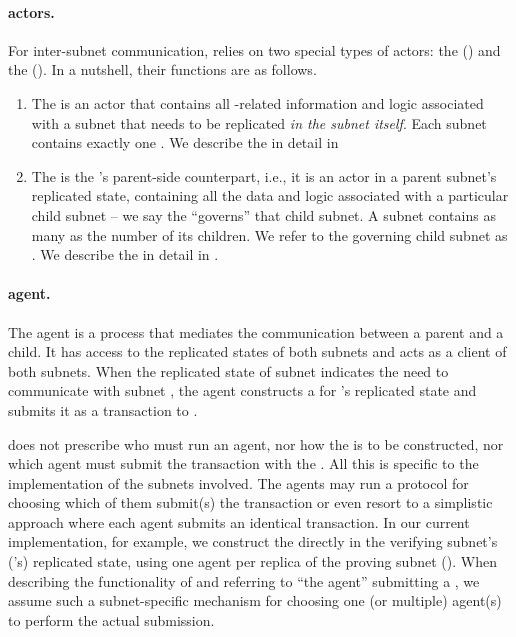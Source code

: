 \paragraph{\ipc actors.}
For inter-subnet communication, \ipc relies on two special types of actors: the \gwFull (\gw) and the \saFull (\sa).
In a nutshell, their functions are as follows.
\begin{enumerate}
    \item The \gw is an actor that contains all \ipc-related information and logic associated with a subnet that needs to be replicated \emph{in the subnet itself}.
    Each subnet contains exactly one \gw. We describe the \gw in detail in 

    \item The \sa is the \gw's parent-side counterpart, i.e., it is an actor in a parent subnet's replicated state,
    containing all the data and logic associated with a particular child subnet -- we say the \sa ``governs'' that child subnet.
    A subnet contains as many \saFulls as the number of its children.
    We refer to the \sa governing child subnet  as .
    We describe the \sa in detail in .

\end{enumerate}

\paragraph{\ipc agent.}

The \ipc agent is a process that mediates the communication between a parent and a child.
It has access to the replicated states of both subnets and acts as a client of both subnets.
When the replicated state of subnet  indicates the need to communicate with subnet ,
the \ipc agent constructs a \pof for 's replicated state and submits it as a transaction to .

\ipc does not prescribe who must run an \ipc agent, nor how the \pof is to be constructed, nor which \ipc agent must submit the transaction with the \pof.
All this is specific to the implementation of the subnets involved.
The \ipc agents may run a protocol for choosing which of them submit(s) the transaction or even resort to a simplistic approach where each \ipc agent submits an identical transaction.
In our current implementation, for example, we construct the \pof directly in the verifying subnet's ('s) replicated state,
using one \ipc agent per replica of the proving subnet ().
When describing the functionality of \ipc and referring to ``the \ipc agent'' submitting a \pof,
we assume such a subnet-specific mechanism for choosing one (or multiple) \ipc agent(s) to perform the actual submission.

